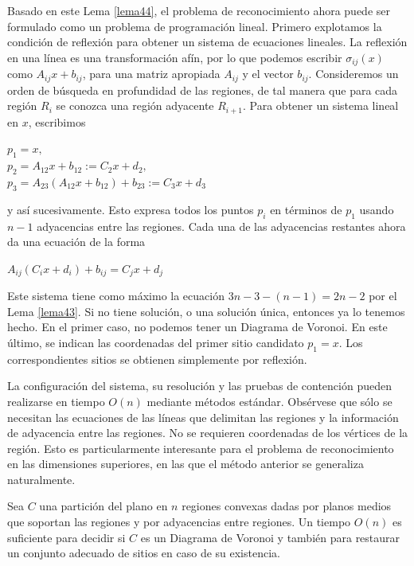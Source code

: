 Basado en este Lema \ref{lema44}, el problema de reconocimiento ahora puede ser formulado como un problema de programación lineal. Primero explotamos la condición de reflexión para obtener un sistema de ecuaciones lineales. 
La reflexión en una línea es una transformación afín, por lo que podemos escribir $\sigma_{ij}(x)$ como $A_{ij}x + b_{ij}$, para una matriz apropiada $A_{ij}$ y el vector $b_{ij}$. Consideremos un orden de búsqueda en profundidad de las regiones, de tal manera que para cada región $R_{i}$ se conozca una región adyacente $R_{i+1}$. Para obtener un sistema lineal en $x$, escribimos
    \begin{center}
        $p_{1} = x, $\\$
        p_{2} = A_{12}x+b_{12} := C_{2}x+d_{2}, $\\$
        p_{3} = A_{23}(A_{12}x+b_{12})+b_{23} := C_{3}x+d_{3}$
    \end{center}
y así sucesivamente. Esto expresa todos los puntos $p_{i}$ en términos de $p_{1}$ usando $n-1$ adyacencias entre las regiones. Cada una de las adyacencias restantes ahora da una ecuación de la forma
    \begin{center}
        $A_{ij}(C_{i}x+d_{i})+b_{ij}=C_{j}x+d_{j}$
    \end{center}
Este sistema tiene como máximo la ecuación $3n-3-(n-1) = 2n-2$ por el Lema \ref{lema43}. Si no tiene solución, o una solución única, entonces ya lo tenemos hecho. En el primer caso, no podemos tener un Diagrama de Voronoi. En este último, se indican las coordenadas del primer sitio candidato $p_{1} = x.$ Los correspondientes sitios se obtienen simplemente por reflexión.
\vspace{0.3cm}

La configuración del sistema, su resolución y las pruebas de contención pueden realizarse en tiempo $O(n)$ mediante métodos estándar. Obsérvese que sólo se necesitan las ecuaciones de las líneas que delimitan las regiones y la información de adyacencia entre las regiones. No se requieren coordenadas de los vértices de la región. Esto es particularmente interesante para el problema de reconocimiento en las dimensiones superiores, en las que el método anterior se generaliza naturalmente.

\begin{teorema}
    Sea $C$ una partición del plano en $n$ regiones convexas dadas por planos medios que soportan las regiones y por adyacencias entre regiones. Un tiempo $O(n)$ es suficiente para decidir si $C$ es un Diagrama de Voronoi y también para restaurar un conjunto adecuado de sitios en caso de su existencia.
\end{teorema}


